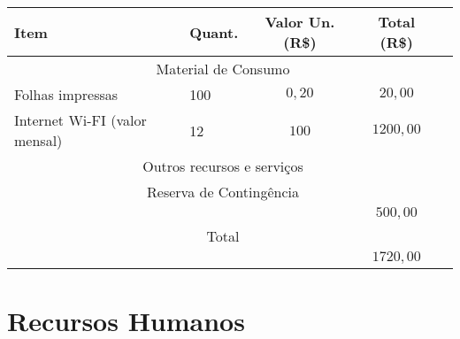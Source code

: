 \begin{tabular}{|X p{3cm}|c|c|c|}
	\hline
	{\cellcolor{shadecolor}} Item & {\cellcolor{shadecolor}} Quant. & {\cellcolor{shadecolor}} Valor Un. (R\$) & {\cellcolor{shadecolor}} Total (R\$) \\ \hline
	\hline
	\multicolumn{4}{|c|}{Material de Consumo}                                                                                                         \\ \hline
	Folhas impressas              & 100                             & $0,20$                                   & $20,00$                              \\ \hline
	Internet Wi-FI (valor mensal) & 12                              & $100$                                    & $1200,00$                            \\ \hline
	\hline
	\multicolumn{4}{|c|}{Outros recursos e serviços}                                                                                                  \\ \hline
	\multicolumn{4}{|c|}{Reserva de Contingência}                                                                                                     \\ \hline
	                              &                                 &                                          & $500,00$                             \\ \hline
	\hline
	\multicolumn{4}{|c|}{Total}                                                                                                                       \\ \hline
	                              &                                 &                                          & $1720,00$                            \\ \hline

\end{tabular}

\section{Recursos Humanos}

